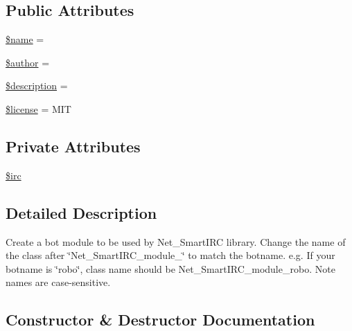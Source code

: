 \subsection*{Public Attributes}
\begin{DoxyCompactItemize}
\item 
\hyperlink{classNet__SmartIRC__module__example_aaebd09582fd081d9afff44777c85c8d8}{\$name} = \textquotesingle{}\textquotesingle{}
\item 
\hyperlink{classNet__SmartIRC__module__example_a84a5abd912985d58483093ee128d6aed}{\$author} = \textquotesingle{}\textquotesingle{}
\item 
\hyperlink{classNet__SmartIRC__module__example_ae66fb76a41befbcdb9ba370dd2a8aafd}{\$description} = \textquotesingle{}\textquotesingle{}
\item 
\hyperlink{classNet__SmartIRC__module__example_a768e94b6407b8020f8d388507ba3fbe1}{\$license} = \textquotesingle{}M\+IT\textquotesingle{}
\end{DoxyCompactItemize}
\subsection*{Private Attributes}
\begin{DoxyCompactItemize}
\item 
\hyperlink{classNet__SmartIRC__module__example_a2d7ea47e77c4dc79aff1c43200e54c82}{\$irc}
\end{DoxyCompactItemize}


\subsection{Detailed Description}
Create a bot module to be used by Net\+\_\+\+Smart\+I\+RC library. Change the name of the class after \char`\"{}\+Net\+\_\+\+Smart\+I\+R\+C\+\_\+module\+\_\+\char`\"{} to match the botname. e.\+g. If your botname is \char`\"{}robo\char`\"{}, class name should be Net\+\_\+\+Smart\+I\+R\+C\+\_\+module\+\_\+robo. Note names are case-\/sensitive. 

\subsection{Constructor \& Destructor Documentation}
